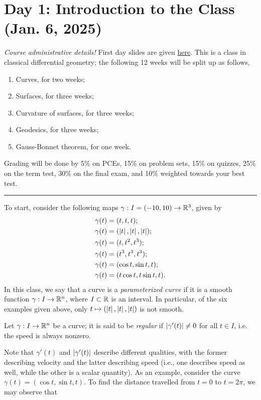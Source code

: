 \section{Day 1: Introduction to the Class (Jan. 6, 2025)}
\textit{Course administrative details!} First day slides are given \href{https://q.utoronto.ca/courses/382094/files/35481757?module_item_id=6420963}{here}. This is a class in classical differential geometry; the following 12 weeks will be split up as follows,
\begin{enumerate}[label=(\alph*)]
    \item Curves, for two weeks;
    \item Surfaces, for three weeks;
    \item Curvature of surfaces, for three weeks;
    \item Geodesics, for three weeks;
    \item Gauss-Bonnet theorem, for one week.
\end{enumerate}
Grading will be done by 5\% on PCEs, 15\% on problem sets, 15\% on quizzes, 25\% on the term test, 30\% on the final exam, and 10\% weighted towards your best test.
\bigskip\hrule\medskip
\noindent To start, consider the following maps $\gamma : I = (-10, 10) \to \mathbb R^3$, given by
\begin{align*}
    \gamma(t) &= (t, t, t); \\
    \gamma(t) &= (\left\lvert t \right\rvert, \left\lvert t \right\rvert, \left\lvert t \right\rvert); \\
    \gamma(t) &= (t, t^2, t^3); \\
    \gamma(t) &= (t^3, t^3, t^3); \\
    \gamma(t) &= (\cos t, \sin t, t); \\
    \gamma(t) &= (t \cos t, t \sin t, t).
\end{align*}
In this class, we say that a curve is a \textit{parameterized curve} if it is a smooth function $\gamma : I \to \mathbb R^n$, where $I \subset \mathbb R$ is an interval. In particular, of the six examples given above, only $t \mapsto (\left\lvert t \right\rvert, \left\lvert t \right\rvert, \left\lvert t \right\rvert)$ is not smooth.
\begin{definition}
    Let $\gamma : I \to \mathbb R^n$ be a curve; it is said to be \textit{regular} if $\left\lvert \gamma'(t) \right\rvert \neq 0$ for all $t \in I$, i.e. the speed is always nonzero.
\end{definition}
\noindent Note that $\gamma'(t)$ and $\left\lvert \gamma'(t) \right\rvert$ describe different qualities, with the former describing velocity and the latter describing speed (i.e., one describes speed as well, while the other is a scalar quantity). As an example, consider the curve $\gamma(t) = (\cos t, \sin t, t)$. To find the distance travelled from $t = 0$ to $t = 2\pi$, we may observe that

